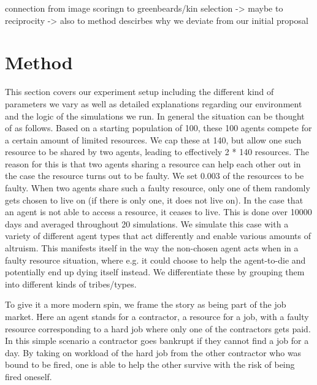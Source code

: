 \documentclass[sigconf]{acmart}
\newcommand{\todo}[1]{{\color{red}{#1}}}
\newcommand{\VNumSimulations}{20\xspace}
\newcommand{\VNumDays}{10000\xspace}
\newcommand{\VNumPop}{100\xspace}
\newcommand{\VNumTrees}{140\xspace}
\newcommand{\VProbPredator}{0.003\xspace}
\begin{document}
    connection from image scoringn to greenbeards/kin selection
    \cite{roberts_kin_2019} -> maybe to reciprocity -> also to method descirbes why we deviate from our initial proposal
    \cite{szamado_deception_2016}\cite{noauthor_indirect_nodate}\cite{bhui_how_2019}


    \section{Method}\label{sec:method}
    This section covers our experiment setup including the different kind of parameters we vary as well as detailed explanations regarding our environment and the logic of the simulations we run.
    In general the situation can be thought of as follows.
    Based on a starting population of \VNumPop, these \VNumPop agents compete for a certain amount of limited resources.
    We cap these at \VNumTrees, but allow one such resource to be shared by two agents, leading to effectively 2 * \VNumTrees resources.
    The reason for this is that two agents sharing a resource can help each other out in the case the resource turns out to be faulty.
    We set \VProbPredator of the resources to be faulty.
    When two agents share such a faulty resource, only one of them randomly gets chosen to live on (if there is only one, it does not live on).
    In the case that an agent is not able to access a resource, it ceases to live.
    This is done over \VNumDays days and averaged throughout \VNumSimulations simulations.
    We simulate this case with a variety of different agent types that act differently and enable various amounts of altruism.
    This manifests itself in the way the non-chosen agent acts when in a faulty resource situation, where e.g. it could choose to help the agent-to-die and potentially end up dying itself instead.
    We differentiate these by grouping them into different kinds of tribes/types.

    To give it a more modern spin, we frame the story as being part of the job market.
    Here an agent stands for a contractor, a resource for a job, with a faulty resource corresponding to a hard job where only one of the contractors gets paid.
    In this simple scenario a contractor goes bankrupt if they cannot find a job for a day.
    By taking on workload of the hard job from the other contractor who was bound to be fired, one is able to help the other survive with the risk of being fired oneself.

    \todo{Add code step by step}
\end{document}
